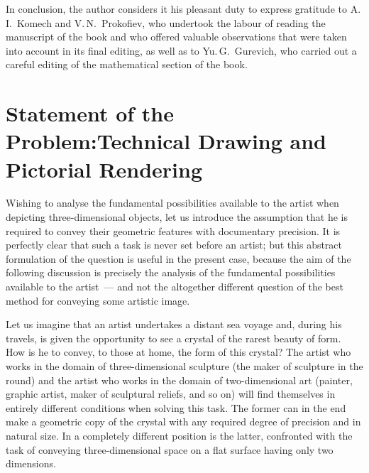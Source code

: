 
In conclusion, the author considers it his pleasant duty to express gratitude to
A.\,I.~Komech and V.\,N.~Prokofiev, who undertook the labour of reading the manuscript
of the book and who offered valuable observations that were taken into account in its
final editing, as well as to Yu.\,G.~Gurevich, who carried out a careful editing of the
mathematical section of the book.

\chapter*{Statement of the Problem:\newline Technical Drawing and Pictorial Rendering}


Wishing to analyse the fundamental possibilities available to the artist when depicting
three-dimensional objects, let us introduce the assumption that he is required to convey
their geometric features with documentary precision. It is perfectly clear that such a task
is never set before an artist; but this abstract formulation of the question is useful in the
present case, because the aim of the following discussion is precisely the analysis of the
fundamental possibilities available to the artist~--- and not the altogether different
question of the best method for conveying some artistic image.

Let us imagine that an artist undertakes a distant sea voyage and, during his travels, is
given the opportunity to see a crystal of the rarest beauty of form. How is he to convey,
to those at home, the form of this crystal? The artist who works in the domain of
three-dimensional sculpture (the maker of sculpture in the round) and the artist who
works in the domain of two-dimensional art (painter, graphic artist, maker of sculptural
reliefs, and so on) will find themselves in entirely different conditions when solving this
task. The former can in the end make a geometric copy of the crystal with any required
degree of precision and in natural size. In a completely different position is the latter,
confronted with the task of conveying three-dimensional space on a flat surface having
only two dimensions.

